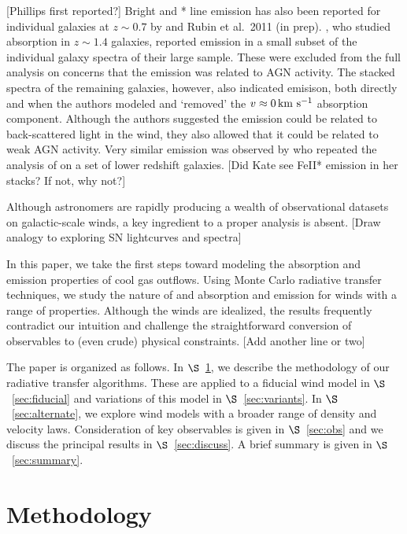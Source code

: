 \documentclass[12pt,preprint]{aastex}
\begin{document}
[Phillips first reported?]
Bright  and * line emission has also been
reported for individual galaxies at $z \sim 0.7$ by \cite{rubin+10c}
and Rubin et al.\ 2011 (in prep).
\cite{wcp+09}, who
studied  absorption in $z \sim 1.4$ galaxies, reported
 emission in a small subset of the individual galaxy
spectra of their large sample.  These were excluded from the full
analysis on concerns that the emission was related to AGN activity.
The stacked spectra of the remaining galaxies, however, also indicated
 emisison, both directly and when the authors modeled and
`removed' the $v \approx 0\, {\rm km~s^{-1}}$ absorption component.  Although the
authors suggested the emission could be related to back-scattered
light in the wind, they also allowed that it could be related to weak
AGN activity.   Very similar  emission was observed by
\cite{rwk+10} who repeated the analysis of \cite{wcp+09} on a set
of lower redshift galaxies. 
[Did Kate see FeII* emission in her stacks? If not, why not?]

Although astronomers are rapidly producing a wealth of observational
datasets on galactic-scale winds, a key ingredient to a proper
analysis is absent.
[Draw analogy to exploring SN lightcurves and spectra]

In this paper, we take the first steps toward modeling the absorption
and emission properties of cool gas outflows.  Using Monte Carlo
radiative transfer techniques, we study the nature of  and
 absorption and emission for winds with a range of
properties.  Although the winds are idealized, the results frequently
contradict our intuition and 
challenge the straightforward conversion of observables to (even crude) physical
constraints.  [Add another line or two]

The paper is organized as follows.  In $\S$~\ref{sec:method}, we
describe the methodology of our radiative transfer algorithms.  These
are applied to a fiducial wind model in $\S$~\ref{sec:fiducial} and
variations of this model in $\S$~\ref{sec:variants}.  In
$\S$~\ref{sec:alternate}, we explore wind models with a broader range
of density and velocity laws.  Consideration of key observables is
given in $\S$~\ref{sec:obs} and we discuss the principal results
in $\S$~\ref{sec:discuss}.  A brief summary is given in
$\S$~\ref{sec:summary}.

\section{Methodology}
\label{sec:method}
\end{document}
